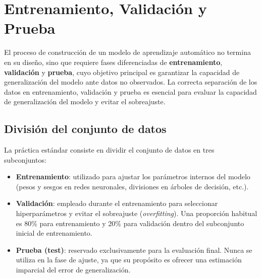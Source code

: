 \documentclass[letterpaper,12pt, twoside]{report}
\providecommand{\DIFdeltex}[1]{{\protect\color{red} \scriptsize #1}} %
\providecommand{\DIFdel}[1]{\texorpdfstring{\DIFdeltex{#1}}{}} %
\begin{document}
\section{\DIFdel{Entrenamiento, Validación y  Prueba}}
\addtocounter{section}{-1}%

\DIFdel{El proceso de construcción de un modelo de aprendizaje automático no termina en su diseño, sino que requiere fases diferenciadas de \textbf{entrenamiento}, \textbf{validación} y \textbf{prueba}, cuyo objetivo principal es garantizar la capacidad de generalización del modelo ante datos no observados. La correcta separación de los datos en entrenamiento, validación y prueba es esencial para evaluar la capacidad de generalización del modelo y evitar el sobreajuste.
}%

\subsection*{\DIFdel{División del conjunto de datos}}
\DIFdel{La práctica estándar consiste en dividir el conjunto de datos en tres subconjuntos:
}%

\begin{itemize}%
\item%
\DIFdel{\textbf{Entrenamiento}: utilizado para ajustar los parámetros internos del modelo (pesos y sesgos en redes neuronales, divisiones en árboles de decisión, etc.).
}%
\item%
\DIFdel{\textbf{Validación}: empleado durante el entrenamiento para seleccionar hiperparámetros y evitar el sobreajuste (\textit{overfitting}). Una proporción habitual es 80\% para entrenamiento y 20\% para validación dentro del subconjunto inicial de entrenamiento.
}%
\item%
\DIFdel{\textbf{Prueba (test)}: reservado exclusivamente para la evaluación final. Nunca se utiliza en la fase de ajuste, ya que su propósito es ofrecer una estimación imparcial del error de generalización.
}
\end{itemize}%

\end{document}
